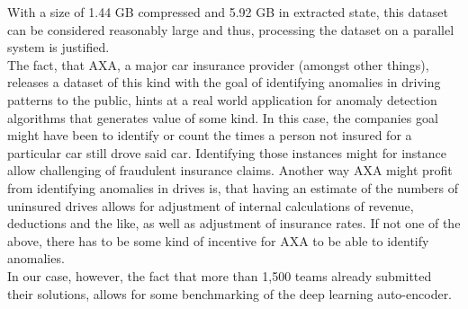 \documentclass{vldb}
\begin{document}
With a size of 1.44 GB compressed and 5.92 GB in extracted state, this dataset can be considered reasonably large and thus, processing the dataset on a parallel system is justified. \\
The fact, that AXA, a major car insurance provider (amongst other things), releases a dataset of this kind with the goal of identifying anomalies in driving patterns to the public, hints at a real world application for anomaly detection algorithms that generates value of some kind. In this case, the companies goal might have been to identify or count the times a person not insured for a particular car still drove said car. Identifying those instances might for instance allow challenging of fraudulent insurance claims. Another way AXA might profit from identifying anomalies in drives is, that having an estimate of the numbers of uninsured drives allows for adjustment of internal calculations of revenue, deductions and the like, as well as adjustment of insurance rates. If not one of the above, there has to be some kind of incentive for AXA to be able to identify anomalies. \\
In our case, however, the fact that more than 1,500 teams already submitted their solutions, allows for some benchmarking of the deep learning auto-encoder.
\end{document}
